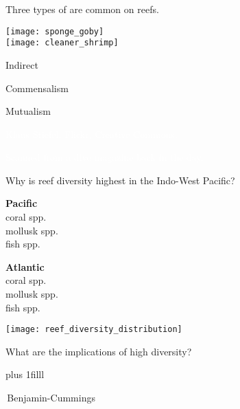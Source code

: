 \documentclass[t]{beamer}
\begin{document}
\begin{frame}[t]{Three types of  are common on reefs.}

\begin{multicols}{2}

	\begin{center}
	
	\texttt{[image: sponge\_goby]}\\[1ex]
	
	\texttt{[image: cleaner\_shrimp]}
	
	\end{center}
	
\columnbreak

	\hangpara Indirect
	
	\hangpara Commensalism
	
	\hangpara Mutualism
		
\end{multicols}

\end{frame}

{
\begin{frame}[b]

\tiny\textcolor{white}{Klaus Stiefel, Flickr, Creative Commons.}
\end{frame}
}

{
\begin{frame}[b]

\tiny\hfill\textcolor{white}{Scanned from a dive magazine back in the day.}
\end{frame}
}

\begin{frame}[t]{Why is reef diversity highest in the Indo-West Pacific?}

\vspace*{-\baselineskip}

\begin{multicols}{2}
	\qquad\qquad\textbf{Pacific}\\
	\qquad{} coral spp.\\
	\qquad{} mollusk spp.\\
	\qquad{} fish spp.
	
\columnbreak
	
	\qquad\textbf{Atlantic}\\
	 coral spp.\\
	 mollusk spp.\\
	 fish spp.
\end{multicols}

\texttt{[image: reef\_diversity\_distribution]}

\hangpara What are the  implications of high diversity?

\vskip0pt plus 1filll

\tiny\textcopyright\,Benjamin-Cummings
\end{frame}
\end{document}
